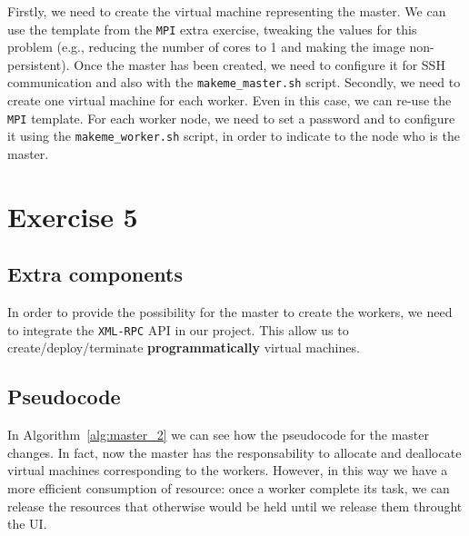 \documentclass[a4paper]{article}
\begin{document}
Firstly, we need to create the virtual machine representing the master. We can use the template from the \texttt{MPI} extra exercise, tweaking the values for this problem (e.g., reducing the number of cores to 1 and making the image non-persistent). Once the master has been created, we need to configure it for SSH communication and also with the \texttt{makeme\_master.sh} script. Secondly, we need to create one virtual machine for each worker. Even in this case, we can re-use the \texttt{MPI} template. For each worker node, we need to set a password and to configure it using the \texttt{makeme\_worker.sh} script, in order to indicate to the node who is the master.

\section{Exercise 5}


\subsection{Extra components}

In order to provide the possibility for the master to create the workers, we need to integrate the \texttt{XML-RPC} API in our project. This allow us to create/deploy/terminate \textbf{programmatically} virtual machines.

\subsection{Pseudocode}


In Algorithm~\ref{alg:master_2} we can see how the pseudocode for the master changes. In fact, now the master has the responsability to allocate and deallocate virtual machines corresponding to the workers. However, in this way we have a more efficient consumption of resource: once a worker complete its task, we can release the resources that otherwise would be held until we release them throught the UI.
\end{document}
